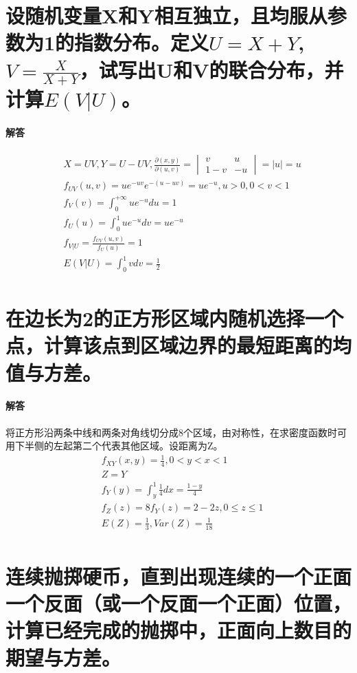\documentclass[UTF8]{ctexart}
\begin{document}
\section{设随机变量X和Y相互独立，且均服从参数为1的指数分布。定义$U=X+Y$,$V=\frac{X}{X+Y}$，试写出U和V的联合分布，并计算$E(V\lvert U)$。}
\paragraph{解答}
\begin{equation*}
\begin{aligned}
&X=UV,Y=U-UV,\frac{\partial(x,y)}{\partial(u,v)}=
\begin{vmatrix}
v&u\\
1-v&-u
\end{vmatrix}
=\lvert u\rvert=u\\
&f_{UV}(u,v)=ue^{-uv}e^{-(u-uv)}=ue^{-u},u>0,0<v<1\\
&f_V(v)=\int_0^{+\infty}ue^{-u}du=1\\
&f_U(u)=\int_0^1ue^{-u}dv=ue^{-u}\\
&f_{V\lvert U}=\frac{f_{UV}(u,v)}{f_U(u)}=1\\
&E(V\lvert U)=\int_0^1vdv=\frac{1}{2}\\
\end{aligned}
\end{equation*}
\section{在边长为2的正方形区域内随机选择一个点，计算该点到区域边界的最短距离的均值与方差。}
\paragraph{解答}
将正方形沿两条中线和两条对角线切分成8个区域，由对称性，在求密度函数时可用下半侧的左起第二个代表其他区域。设距离为Z。
\begin{equation*}
\begin{aligned}
&f_{XY}(x,y)=\frac{1}{4},0<y<x<1\\
&Z=Y\\
&f_Y(y)=\int_y^1\frac{1}{4}dx=\frac{1-y}{4}\\
&f_Z(z)=8f_Y(z)=2-2z,0\leq z\leq1\\
&E(Z)=\frac{1}{3},Var(Z)=\frac{1}{18}\\
\end{aligned}
\end{equation*}
\section{连续抛掷硬币，直到出现连续的一个正面一个反面（或一个反面一个正面）位置，计算已经完成的抛掷中，正面向上数目的期望与方差。}
\end{document}
